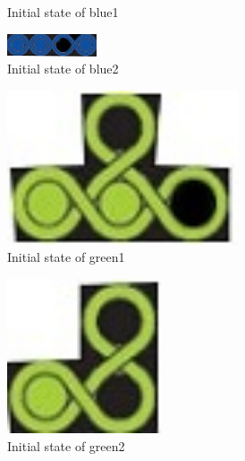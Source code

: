 \begin{figure}[htbp]
\begin{subfigure}[b]{.24\textwidth}
\caption{Initial state of blue1}
  \label{fig:2Dblue1}
\end{subfigure}
\begin{subfigure}[b]{.24\textwidth}
\centering
\includegraphics[width=\textwidth]{figs/blue2.jpg}
\caption{Initial state of blue2}
  \label{fig:2Dblue2}
\end{subfigure}
\begin{subfigure}[b]{.24\textwidth}
\centering
\includegraphics[width=0.75\textwidth]{figs/green1.jpg}
\caption{Initial state of green1}
  \label{fig:2Dgreen1}
\end{subfigure}
\begin{subfigure}[b]{.24\textwidth}
\centering
\includegraphics[width =0.5\textwidth]{figs/green2.jpg}
\caption{Initial state of green2}
  \label{fig:2Dgreen2}
\end{subfigure}
\begin{subfigure}[b]{.24\textwidth}

\end{subfigure}
\end{figure}
